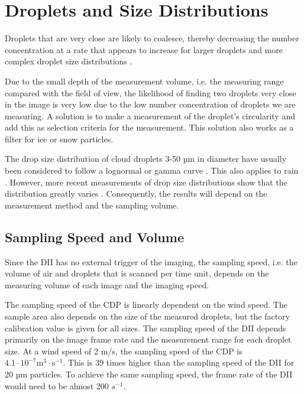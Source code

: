 \section{Droplets and Size Distributions}

Droplets that are very close are likely to coalesce, thereby decreasing the number concentration at a rate that appears to increase for larger droplets and more complex droplet size distributions \cite{borda2011}. 

Due to the small depth of the measurement volume, i.e. the measuring range compared with the field of view, the likelihood of finding two droplets very close in the image is very low due to the low number concentration of droplets we are measuring. A solution is to make a measurement of the droplet’s circularity and add this as selection criteria for the measurement. This solution also works as a filter for ice or snow particles. 

The drop size distribution of cloud droplets 3-50 µm in diameter have usually been considered to follow a lognormal or gamma curve \cite{miles2000,lee2010,sein1998}. This also applies to rain \cite{ulb1983}. However, more recent measurements of drop size distributions show that the distribution greatly varies \cite{james2001,shaw2002,peters2005,cob2011}. Consequently, the results will depend on the measurement method and the sampling volume.

\subsection{Sampling Speed and Volume}

Since the DII has no external trigger of the imaging, the sampling speed, i.e. the volume of air and droplets that is scanned per time unit, depends on the measuring volume of each image and the imaging speed. 

The sampling speed of the CDP is linearly dependent on the wind speed. The sample area also depends on the size of the measured droplets, but the factory calibration value is given for all sizes. The sampling speed of the DII depends primarily on the image frame rate and the measurement range for each droplet size. At a wind speed of 2 m/s, the sampling speed of the CDP is $\mathrm{4.1 \cdot 10^{-7} m^{3} \cdot s^{-1}}$. This is 39 times higher than the sampling speed of the DII for 20 µm particles. To achieve the same sampling speed, the frame rate of the DII would need to be almost 200 $s^{-1}$. 

